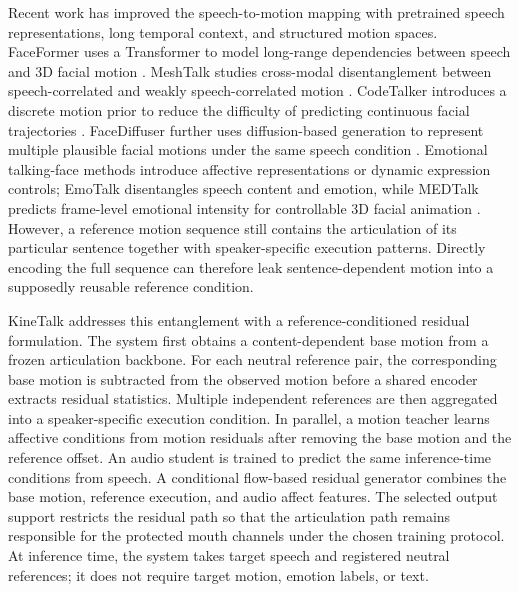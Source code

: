 \documentclass[conference]{IEEEtran}
\begin{document}
Recent work has improved the speech-to-motion mapping with pretrained speech representations, long temporal context, and structured motion spaces. FaceFormer uses a Transformer to model long-range dependencies between speech and 3D facial motion \cite{faceformer}. MeshTalk studies cross-modal disentanglement between speech-correlated and weakly speech-correlated motion \cite{meshtalk}. CodeTalker introduces a discrete motion prior to reduce the difficulty of predicting continuous facial trajectories \cite{codetalker}. FaceDiffuser further uses diffusion-based generation to represent multiple plausible facial motions under the same speech condition \cite{facediffuser}. Emotional talking-face methods introduce affective representations or dynamic expression controls; EmoTalk disentangles speech content and emotion, while MEDTalk predicts frame-level emotional intensity for controllable 3D facial animation \cite{emotalk,medtalk}. However, a reference motion sequence still contains the articulation of its particular sentence together with speaker-specific execution patterns. Directly encoding the full sequence can therefore leak sentence-dependent motion into a supposedly reusable reference condition.

KineTalk addresses this entanglement with a reference-conditioned residual formulation. The system first obtains a content-dependent base motion from a frozen articulation backbone. For each neutral reference pair, the corresponding base motion is subtracted from the observed motion before a shared encoder extracts residual statistics. Multiple independent references are then aggregated into a speaker-specific execution condition. In parallel, a motion teacher learns affective conditions from motion residuals after removing the base motion and the reference offset. An audio student is trained to predict the same inference-time conditions from speech. A conditional flow-based residual generator combines the base motion, reference execution, and audio affect features. The selected output support restricts the residual path so that the articulation path remains responsible for the protected mouth channels under the chosen training protocol. At inference time, the system takes target speech and registered neutral references; it does not require target motion, emotion labels, or text.
\end{document}
